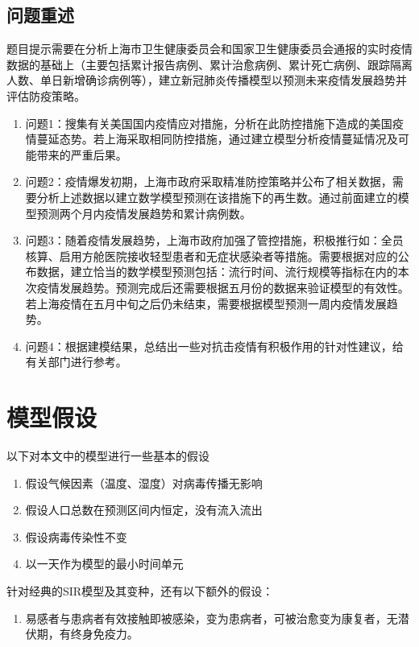 \documentclass[bwprint]{gmcmthesis}
\numberwithin{figure}{section}
\begin{document}
\subsection{问题重述}
题目提示需要在分析上海市卫生健康委员会和国家卫生健康委员会通报的实时疫情数据的基础上（主要包括累计报告病例、累计治愈病例、累计死亡病例、跟踪隔离人数、单日新增确诊病例等），建立新冠肺炎传播模型以预测未来疫情发展趋势并评估防疫策略。
\begin{enumerate}
\item
问题1：搜集有关美国国内疫情应对措施，分析在此防控措施下造成的美国疫情蔓延态势。若上海采取相同防控措施，通过建立模型分析疫情蔓延情况及可能带来的严重后果。
\item 问题2：疫情爆发初期，上海市政府采取精准防控策略并公布了相关数据，需要分析上述数据以建立数学模型预测在该措施下的再生数。通过前面建立的模型预测两个月内疫情发展趋势和累计病例数。
\item 问题3：随着疫情发展趋势，上海市政府加强了管控措施，积极推行如：全员核算、启用方舱医院接收轻型患者和无症状感染者等措施。需要根据对应的公布数据，建立恰当的数学模型预测包括：流行时间、流行规模等指标在内的本次疫情发展趋势。预测完成后还需要根据五月份的数据来验证模型的有效性。若上海疫情在五月中旬之后仍未结束，需要根据模型预测一周内疫情发展趋势。
\item 问题4：根据建模结果，总结出一些对抗击疫情有积极作用的针对性建议，给有关部门进行参考。
\end{enumerate}



\section{模型假设}
\par 以下对本文中的模型进行一些基本的假设
\begin{enumerate}
\item 假设气候因素（温度、湿度）对病毒传播无影响
\item 假设人口总数在预测区间内恒定，没有流入流出
\item 假设病毒传染性不变
\item 以一天作为模型的最小时间单元
\end{enumerate}

\par 针对经典的SIR模型及其变种，还有以下额外的假设：
\begin{enumerate}
    \item 易感者与患病者有效接触即被感染，变为患病者，可被治愈变为康复者，无潜伏期，有终身免疫力。
\end{enumerate}
    
\end{document}
